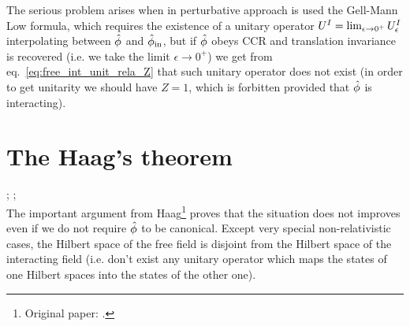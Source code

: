 \documentclass[../main/main.tex]{subfiles}
\begin{document}
The serious problem arises when in perturbative approach is used the Gell-Mann Low formula, which requires the existence of a unitary operator $U^I=\lim_{\epsilon\to0^+}\uei$ interpolating between $\hat{\phi}$ and $\hat{\phi}_{\textnormal{in}}$, but if $\hat{\phi}$ obeys CCR and translation invariance is recovered (i.e. we take the limit $\epsilon\to0^+$) we get from eq.~\eqref{eq:free_int_unit_rela_Z}  that such unitary operator does not exist (in order to get unitarity we should have $Z=1$, which is forbitten provided that $\hat{\phi}$ is interacting).

\section{The Haag's theorem}

\cite[Section 3]{Earman:2005}; \cite[Section 4.5]{Streater:2000}; \cite[Pages 39-40, 95-96]{Strocchi_2013}\\

The important argument from Haag\footnote{Original paper: \cite{Haag:1955}.} proves that the situation does not improves even if we do not require $\hat{\phi}$ to be canonical. Except very special non-relativistic cases, the Hilbert space of the free field is disjoint from the Hilbert space of the interacting field (i.e. don't exist any unitary operator which maps the states of one Hilbert spaces into the states of the other one). 
\end{document}
